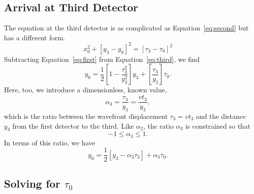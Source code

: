 \documentclass[twocolumn]{article}
\begin{document}
\subsection{Arrival at Third Detector}

The equation at the third detector is as complicated as
Equation~\ref{eq:second} but has a different form.
\begin{equation}
   x_0^2 + \left[y_3 - y_0\right]^2 = \left[\tau_3 - \tau_0\right]^2
   \label{eq:third}
\end{equation}
Subtracting Equation~\ref{eq:first} from Equation~\ref{eq:third}, we find
\begin{equation}
   y_0 = \frac{1}{2}\left[1 - \frac{\tau_3^2}{y_3^2}\right] y_3 +
         \left[\frac{\tau_3}{y_3}\right] \tau_0.
\end{equation}
Here, too, we introduce a dimensionless, known value,
\begin{equation}
   \alpha_3 = \frac{\tau_3}{y_3} = \frac{v t_3}{y_3},
\end{equation}
which is the ratio between the wavefront displacement $\tau_3 = vt_3$ and the
distance $y_3$ from the first detector to the third.  Like $\alpha_2$, the
ratio $\alpha_3$ is constrained so that
\begin{equation}
   -1 \leq \alpha_3 \leq 1.
\end{equation}
In terms of this ratio, we have
\begin{equation}
   y_0 = \frac{1}{2}\left[y_3 - \alpha_3\tau_3\right] + \alpha_3\tau_0.
   \label{eq:t-y}
\end{equation}

\subsection{Solving for $\tau_0$}
\end{document}
